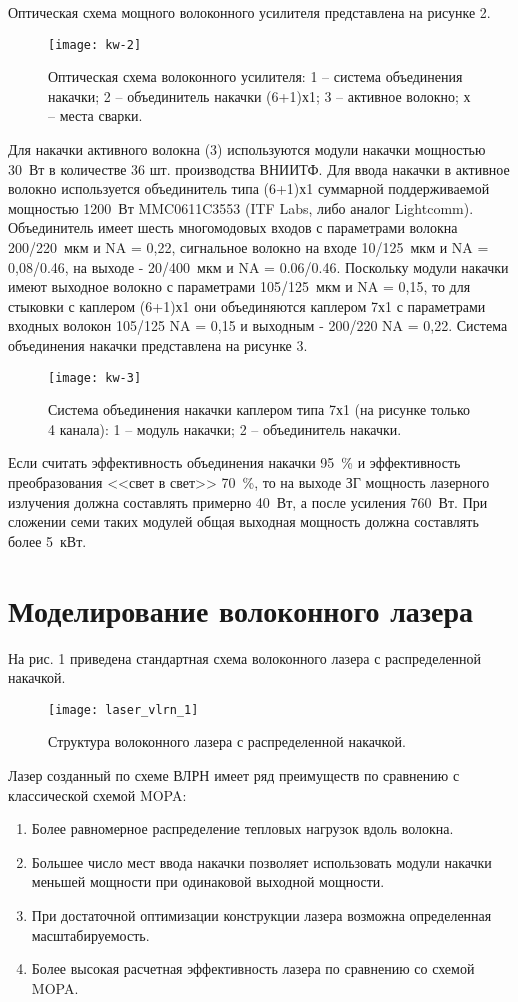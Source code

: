 Оптическая схема мощного волоконного усилителя представлена на рисунке 2.
\begin{figure}
  \centering
  \texttt{[image: kw-2]}
  \caption{Оптическая схема волоконного усилителя: 1 – система объединения накачки; 2 – объединитель накачки (6+1)х1; 3 – активное волокно; х – места сварки.}
  \label{img:kw-2}
\end{figure}
Для накачки активного волокна (3) используются модули накачки мощностью 30~Вт в количестве 36 шт. производства ВНИИТФ. Для ввода накачки в активное волокно используется объединитель типа (6+1)х1 суммарной поддерживаемой мощностью 1200~Вт MMC0611C3553 (ITF Labs, либо аналог Lightcomm). Объединитель имеет шесть многомодовых входов с параметрами волокна 200/220~мкм и NA = 0,22, сигнальное волокно на входе 10/125~мкм и NA = 0,08/0.46, на выходе - 20/400~мкм и NA = 0.06/0.46. Поскольку модули накачки имеют выходное волокно с параметрами 105/125~мкм и NA = 0,15, то для стыковки с каплером (6+1)х1 они объединяются каплером 7х1 с параметрами входных волокон 105/125 NA = 0,15 и выходным - 200/220 NA = 0,22. Система объединения накачки представлена на рисунке 3.
\begin{figure}
  \centering
  \texttt{[image: kw-3]}
  \caption{Система объединения накачки каплером типа 7х1 (на рисунке только 4 канала): 1 – модуль накачки; 2 – объединитель накачки.}
  \label{img:kw-3}
\end{figure}

Если считать эффективность объединения накачки 95~\% и эффективность преобразования <<свет в свет>> 70~\%, то на выходе ЗГ мощность лазерного излучения должна составлять примерно 40~Вт, а после усиления 760~Вт. При сложении семи таких модулей общая выходная мощность должна составлять более 5~кВт.

\section{Моделирование волоконного лазера}
\label{sec:kw-modeling}

На рис. 1 приведена стандартная схема волоконного лазера с распределенной накачкой.

\begin{figure}[ht]
  \centering
  \texttt{[image: laser\_vlrn\_1]}
  \caption{Структура волоконного лазера с распределенной накачкой.}
  \label{img:laser_vlrn_1}
\end{figure}

Лазер созданный по схеме ВЛРН имеет ряд преимуществ по сравнению с классической схемой MOPA:
\begin{enumerate}
  \item Более равномерное распределение тепловых нагрузок вдоль волокна.
  \item Большее число мест ввода накачки позволяет использовать модули накачки меньшей мощности при одинаковой выходной мощности.
  \item При достаточной оптимизации конструкции лазера возможна определенная масштабируемость.
  \item Более высокая расчетная эффективность лазера по сравнению со схемой MOPA.
\end{enumerate}

